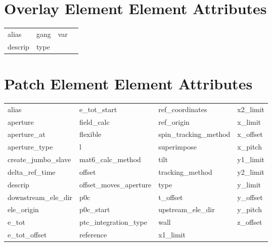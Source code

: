  \vfill
 
 \section{Overlay Element Element Attributes}
 \label{s:list.overlay}
 
 \begin{tabular}{llll} \toprule
alias                       & gang                        & var                         &                             \\
descrip                     & type                        &                             &                             \\
 \bottomrule
 \end{tabular}
 \vfill
 
 \section{Patch Element Element Attributes}
 \label{s:list.patch}
 
 \begin{tabular}{llll} \toprule
alias                       & e_tot_start                 & ref_coordinates             & x2_limit                    \\
aperture                    & field_calc                  & ref_origin                  & x_limit                     \\
aperture_at                 & flexible                    & spin_tracking_method        & x_offset                    \\
aperture_type               & l                           & superimpose                 & x_pitch                     \\
create_jumbo_slave          & mat6_calc_method            & tilt                        & y1_limit                    \\
delta_ref_time              & offset                      & tracking_method             & y2_limit                    \\
descrip                     & offset_moves_aperture       & type                        & y_limit                     \\
downstream_ele_dir          & p0c                         & t_offset                    & y_offset                    \\
ele_origin                  & p0c_start                   & upstream_ele_dir            & y_pitch                     \\
e_tot                       & ptc_integration_type        & wall                        & z_offset                    \\
e_tot_offset                & reference                   & x1_limit                    &                             \\
 \bottomrule
 \end{tabular}
 \vfill
 
